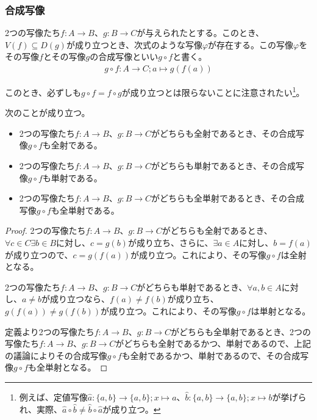 \documentclass[dvipdfmx]{jsarticle}
\begin{document}
\subsubsection{合成写像}%
\begin{dfn}
2つの写像たち$f:A \rightarrow B$、$g:B \rightarrow C$が与えられたとする。このとき、$V(f) \subseteq D(g)$が成り立つとき、次式のような写像$\varphi$が存在する。この写像$\varphi$をその写像$f$とその写像$g$の合成写像といい$g \circ f$と書く。
\begin{align*}
g \circ f:A \rightarrow C;a \mapsto g\left( f(a) \right)
\end{align*}
\end{dfn}
このとき、必ずしも$g \circ f = f \circ g$が成り立つとは限らないことに注意されたい\footnote{例えば、定値写像$\hat{a} :\{a,b\}\rightarrow \{a,b\} ;x\mapsto a$、$\hat{b} :\{a,b\}\rightarrow \{a,b\} ;x\mapsto b$が挙げられ、実際、$\hat{a} \circ \hat{b} \ne \hat{b} \circ \hat{a} $が成り立つ。}。
\begin{thm}
\label{1.2.3.14}
次のことが成り立つ。
\begin{itemize}
\item
  2つの写像たち$f:A \rightarrow B$、$g:B \rightarrow C$がどちらも全射であるとき、その合成写像$g \circ f$も全射である。
\item
  2つの写像たち$f:A \rightarrow B$、$g:B \rightarrow C$がどちらも単射であるとき、その合成写像$g \circ f$も単射である。
\item
  2つの写像たち$f:A \rightarrow B$、$g:B \rightarrow C$がどちらも全単射であるとき、その合成写像$g \circ f$も全単射である。
\end{itemize}
\end{thm}
\begin{proof}
2つの写像たち$f:A \rightarrow B$、$g:B \rightarrow C$がどちらも全射であるとき、$\forall c \in C\exists b \in B$に対し、$c = g(b)$が成り立ち、さらに、$\exists a \in A$に対し、$b = f(a)$が成り立つので、$c = g\left( f(a) \right)$が成り立つ。これにより、その写像$g \circ f$は全射となる。\par
2つの写像たち$f:A \rightarrow B$、$g:B \rightarrow C$がどちらも単射であるとき、$\forall a,b \in A$に対し、$a \neq b$が成り立つなら、$f(a) \neq f(b)$が成り立ち、$g\left( f(a) \right) \neq g\left( f(b) \right)$が成り立つ。これにより、その写像$g \circ f$は単射となる。\par
定義より2つの写像たち$f:A \rightarrow B$、$g:B \rightarrow C$がどちらも全単射であるとき、2つの写像たち$f:A \rightarrow B$、$g:B \rightarrow C$がどちらも全射であるかつ、単射であるので、上記の議論によりその合成写像$g \circ f$も全射であるかつ、単射であるので、その合成写像$g \circ f$も全単射となる。
\end{proof}
\end{document}
